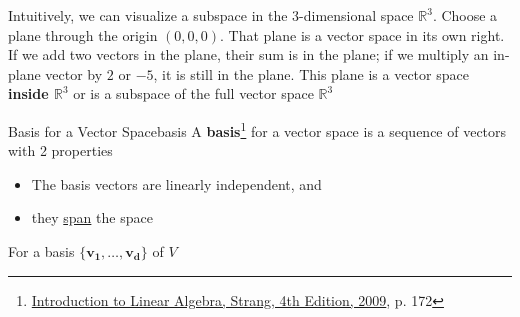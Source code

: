 Intuitively, we can visualize a subspace in the 3-dimensional space $\mathbb{R}^3$. Choose a plane through the
origin $(0, 0, 0)$. That plane is a vector space in its own right. If we add two vectors in the plane, their sum is in
the plane; if we multiply an in-plane vector by $2$ or $-5$, it is still in the plane. This plane is a vector space
\textbf{inside $\mathbb{R}^3$} or is a subspace of the full vector space $\mathbb{R}^3$


\begin{Definition}{Basis for a Vector Space}{basis}
    A \textbf{basis}\footnote{\href{https://trello.com/c/qHJeDNkU}{Introduction to Linear Algebra, Strang, 4th Edition, 2009}, p. 172} for a vector space is a sequence of vectors with 2 properties

    \begin{itemize}
        \item The basis vectors are linearly independent, and
        \item they \hyperlink{column-space}{span} the space
    \end{itemize}
\end{Definition}

For a basis $\{\boldsymbol{v_1}, \ldots, \boldsymbol{v_d}\}$ of $V$

